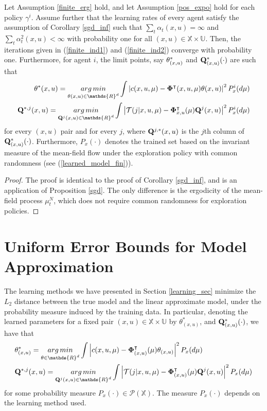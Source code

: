 \documentclass[twoside,11pt]{article}
\def\argmin{\mathop{\rm arg\, min}}
\def\P{{\mathcal P}}
\begin{document}
\begin{corollary}
Let Assumption \ref{finite_erg} hold, and let Assumption \ref{pos_expo} hold for each policy $\gamma^i$. Assume further that the learning rates of every agent satisfy the assumption of Corollary \ref{sgd_inf} such that $\sum_t \alpha_t(x,u)=\infty$ and $\sum_t \alpha_t^2(x,u)<\infty$ with probability one for all $(x,u)\in\mathds{X}\times\mathds{U}$. Then, the iterations given in (\ref{finite_ind1}) and (\ref{finite_ind2}) converge with probability one. Furthermore, for agent $i$, the limit points, say ${\bf \theta}^*_{(x,u)}$ and ${\bf Q}^*_{(x,u)}(\cdot)$ are such that 
\begin{align*}
{\bf \theta}^*(x,u)= \argmin_{\theta(x,u)\in \mathds{R}^d} \int \left| c(x,u,\mu) - {\bf \Phi}^\intercal(x,u,\mu) {\bf \theta}(x,u)\right|^2 P^i_{x}(d\mu)\\
{\bf Q}^{*,j}{(x,u)} = \argmin_{{\bf Q}^j{(x,u)} \in \mathds{R}^{d}}  \int \left|\mathcal{T}(j|x,u,\mu) - {\bf \Phi}_{x,u}^\intercal(\mu)   {\bf Q}^j{(x,u)} \right|^2 P^i_{x}(d\mu)
\end{align*}
for every $(x,u)$ pair and for every $j$, where ${\bf Q}^{j,*}{(x,u)}$ is the $j$th column of  ${\bf Q}^*_{(x,u)}(\cdot)$. Furthermore, $P_{x}(\cdot)$ denotes the trained set based on the invariant measure of the mean-field flow under the exploration policy with common randomness (see (\ref{learned_model_fin})).
\end{corollary}

\begin{proof}
The proof is identical to the proof of Corollary \ref{sgd_inf}, and is an application of Proposition \ref{sgd}. The only difference is the ergodicity of the mean-field process $\mu_t^N$, which does not require common randomness for exploration policies.
\end{proof}


\section{Uniform Error Bounds for Model Approximation}\label{unif_err_est}
The learning methods we have presented in Section \ref{learning_sec} minimize the $L_2$ distance between the true model and the linear approximate model, under the probability measure induced by the training data. In particular, denoting the learned parameters for a fixed pair $(x,u)\in\mathds{X}\times\mathds{U}$ by $\theta^*_{(x,u)}$, and ${\bf Q}_{(x,u)}^*(\cdot)$, we have that
 \begin{align}\label{lin_least_square}
&{\bf \theta}^*_{(x,u)}= \argmin_{\theta\in\mathds{R}^d} \int \left| c(x,u,\mu) - {\bf \Phi}_{(x,u)}^\intercal(\mu) {\bf \theta}_{(x,u)}\right|^2 P_{x}(d\mu)\nonumber\\
&{\bf Q}^{*,j}{(x,u)} = \argmin_{{\bf Q}^j{(x,u)} \in \mathds{R}^{d}}  \int \left|\mathcal{T}(j|x,u,\mu) - {\bf \Phi}_{(x,u)}^\intercal(\mu)   {\bf Q}^j{(x,u)} \right|^2 P_{x}(d\mu)
\end{align}
for some probability measure $P_{x}(\cdot)\in \P(\mathds{X})$. The measure $P_{x}(\cdot)$ depends on the learning method used. 
\end{document}
